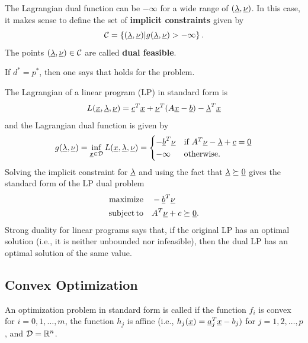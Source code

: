 The Lagrangian dual function can be $-\infty$ for a wide range of $(\underline{\lambda},\underline{\nu})$.
In this case, it makes sense to define the set of \textbf{implicit constraints} given by
\[ \mathcal{C} = \left\{ (\underline{\lambda},\underline{\nu}) |  g(\underline{\lambda},\underline{\nu}) > -\infty \right\}. \]
The points $(\underline{\lambda},\underline{\nu}) \in \mathcal{C}$ are called \textbf{dual feasible}.

\begin{definition}
If $d^* = p^*$, then one says that  holds for the problem.
\end{definition}

\begin{example}
The Lagrangian of a linear program (LP) in standard form is
\[ L(\underline{x},\underline{\lambda},\underline{\nu}) = \underline{c}^T \underline{x} + \underline{\nu}^T (A\underline{x}-\underline{b}) - \underline{\lambda}^T \underline{x} \]
and the Lagrangian dual function is given by
\begin{equation*}
g(\underline{\lambda},\underline{\nu})
= \inf_{\underline{x}\in \mathcal{D}} L(\underline{x},\underline{\lambda},\underline{\nu})
= \begin{cases} -\underline{b}^T \underline{\nu} & \text{if }A^T \underline{\nu} - \underline{\lambda} + \underline{c} = \underline{0} \\
-\infty & \text{otherwise}. \end{cases}
\end{equation*}
Solving the implicit constraint for $\underline{\lambda}$ and using the fact that $\underline{\lambda} \succeq \underline{0}$ gives the standard form of the LP dual problem
\begin{align*}
\mathrm{maximize} \quad & -\underline{b}^T \underline{\nu} \\
\mathrm{subject\,to} \quad & A^T \underline{\nu} + c \succeq \underline{0}.
\end{align*}
Strong duality for linear programs says that, if the original LP has an optimal solution (i.e., it is neither unbounded nor infeasible), then the dual LP has an optimal solution of the same value.
\end{example}

\subsection{Convex Optimization}

\begin{definition}
An optimization problem in standard form is called  if the function $f_i$ is convex for $i=0,1,\ldots,m$, the function $h_j$ is affine (i.e., $h_j(\underline{x}) = \underline{a}_j^T \underline{x} - b_j)$ for $j=1,2,\ldots,p$, and $\mathcal{D}=\mathbb{R}^n$. 
\end{definition}

